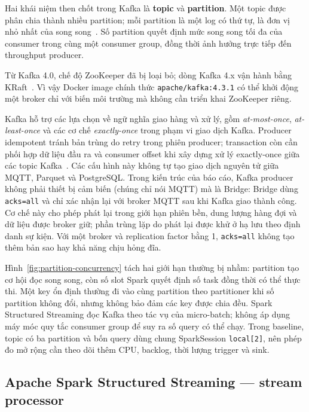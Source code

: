 Hai khái niệm then chốt trong Kafka là \textbf{topic} và \textbf{partition}.
Một topic được phân chia thành nhiều partition; mỗi partition là một log
có thứ tự, là đơn vị nhỏ nhất của song song~\cite{confluent_partition_count}.
Số partition quyết định mức song song tối đa của consumer trong cùng một
consumer group, đồng thời ảnh hưởng trực tiếp đến throughput producer.

Từ Kafka 4.0, chế độ ZooKeeper đã bị loại bỏ; dòng Kafka 4.x vận hành
bằng KRaft~\cite{kafka_docs_4_3}. Vì vậy Docker
image chính thức \texttt{apache/kafka:4.3.1} có thể khởi động một broker
chỉ với biến môi trường mà không cần triển khai ZooKeeper riêng.

Kafka hỗ trợ các lựa chọn về ngữ nghĩa giao hàng và xử lý, gồm
\textit{at-most-once}, \textit{at-least-once} và các cơ chế
\textit{exactly-once} trong phạm vi giao dịch Kafka. Producer idempotent
tránh bản trùng do retry trong phiên producer; transaction còn cần phối
hợp dữ liệu đầu ra và consumer offset khi xây dựng xử lý exactly-once
giữa các topic Kafka~\cite{kafka_docs_4_3}. Các cấu hình này không tự tạo
giao dịch nguyên tử giữa MQTT, Parquet và PostgreSQL.
Trong kiến trúc của báo cáo, Kafka producer không phải thiết bị cảm biến
(chúng chỉ nói MQTT) mà là Bridge: Bridge dùng \texttt{acks=all} và chỉ xác
nhận lại với broker MQTT sau khi Kafka giao thành công. Cơ chế này cho
phép phát lại trong giới hạn phiên bền, dung lượng hàng đợi và dữ liệu
được broker giữ; phần trùng lặp do phát lại được khử ở hạ lưu theo định
danh sự kiện. Với một broker và replication factor bằng 1, \texttt{acks=all}
không tạo thêm bản sao hay khả năng chịu hỏng đĩa.



Hình~\ref{fig:partition-concurrency} tách hai giới hạn thường bị nhầm:
partition tạo cơ hội đọc song song, còn số slot Spark quyết định số task
đồng thời có thể thực thi. Một key ổn định thường đi vào cùng partition
theo partitioner khi số partition không đổi, nhưng không bảo đảm các key
được chia đều. Spark Structured Streaming đọc Kafka theo tác vụ của
micro-batch; không áp dụng máy móc quy tắc consumer group để suy ra số
query có thể chạy. Trong baseline, topic có ba partition và bốn query
dùng chung SparkSession \texttt{local[2]}, nên phép đo mở rộng cần theo
dõi thêm CPU, backlog, thời lượng trigger và sink.

\subsection{Apache Spark Structured Streaming --- stream processor}


